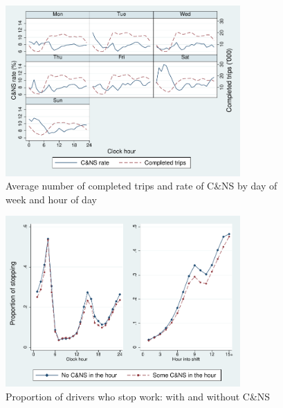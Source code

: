 \documentclass[reviewmode]{restud}
\begin{document}
\begin{figure}
	\centering
	\includegraphics[width=0.8\textwidth]{./fg/dowplot.pdf}
	\caption{Average number of completed trips and rate of C\&NS by day of week and hour of day}
	\label{fg:trips}
\end{figure}


\begin{figure}
	{\centering
		\includegraphics[width=0.8\textwidth]{./fg/modelfree_quit_vert.pdf}
		\caption{Proportion of drivers who stop work: with and without C\&NS}
		\label{fg:quitbyhour}
	}
\end{figure}
\end{document}
